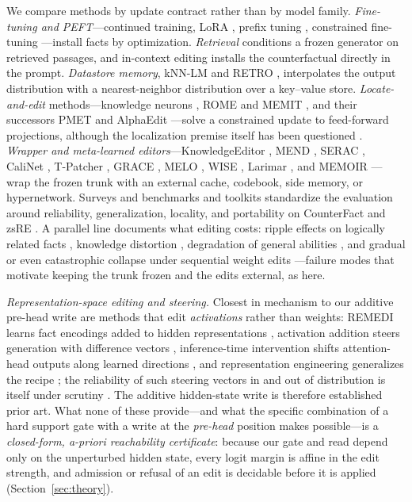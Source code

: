 \documentclass[10pt,twocolumn]{article}
\theoremstyle{remark}
\begin{document}
We compare methods by update contract rather than by model family.
\emph{Fine-tuning and PEFT}---continued training, LoRA \citep{hu2021lora}, prefix
tuning \citep{li2021prefix}, constrained fine-tuning \citep{zhu2020modifying}---install
facts by optimization. \emph{Retrieval} \citep{lewis2020rag} conditions a frozen
generator on retrieved passages, and in-context editing \citep{zheng2023ike}
installs the counterfactual directly in the prompt. \emph{Datastore memory},
kNN-LM and RETRO
\citep{khandelwal2019knnlm, borgeaud2021retro}, interpolates the output
distribution with a nearest-neighbor distribution over a key--value store.
\emph{Locate-and-edit} methods---knowledge neurons \citep{dai2022neurons}, ROME
and MEMIT \citep{meng2022rome, meng2022memit}, and their successors PMET
\citep{li2024pmet} and AlphaEdit \citep{fang2025alphaedit}---solve a constrained
update to feed-forward projections, although the localization premise itself has
been questioned \citep{hase2023localization}.
\emph{Wrapper and meta-learned editors}---KnowledgeEditor \citep{decao2021editing},
MEND \citep{mitchell2021mend}, SERAC \citep{mitchell2022serac}, CaliNet
\citep{dong2022calinet}, T-Patcher \citep{huang2023tpatcher}, GRACE
\citep{hartvigsen2023grace}, MELO \citep{yu2024melo}, WISE \citep{wang2024wise},
Larimar \citep{das2024larimar}, and MEMOIR \citep{wang2025memoir}---wrap the
frozen trunk with an external cache, codebook, side memory, or hypernetwork.
Surveys and benchmarks \citep{yao2023editing, zhang2024knowedit} and toolkits
\citep{wang2023easyedit} standardize the evaluation around reliability,
generalization, locality, and portability \citep{zhong2023mquake} on CounterFact
\citep{meng2022rome} and zsRE \citep{levy2017zeroshot}. A parallel line documents
what editing costs: ripple effects on logically related facts
\citep{cohen2024ripple}, knowledge distortion \citep{li2024pitfalls}, degradation
of general abilities \citep{gu2024harms}, and gradual or even catastrophic
collapse under sequential weight edits \citep{gupta2024forgetting,
yang2024butterfly}---failure modes that motivate keeping the trunk frozen and the
edits external, as here.

\emph{Representation-space editing and steering.} Closest in mechanism to our
additive pre-head write are methods that edit \emph{activations} rather than
weights: REMEDI learns fact encodings added to hidden representations
\citep{hernandez2024remedi}, activation addition steers generation with
difference vectors \citep{turner2023actadd}, inference-time intervention shifts
attention-head outputs along learned directions \citep{li2023iti}, and
representation engineering generalizes the recipe \citep{zou2023repe}; the
reliability of such steering vectors in and out of distribution is itself under
scrutiny \citep{tan2024steering}. The additive hidden-state write is therefore
established prior art. What none of these provide---and what the specific
combination of a hard support gate with a write at the \emph{pre-head} position
makes possible---is a \emph{closed-form, a-priori reachability certificate}:
because our gate and read depend only on the unperturbed hidden state, every
logit margin is affine in the edit strength, and admission or refusal of an edit
is decidable before it is applied (Section~\ref{sec:theory}).
\end{document}
